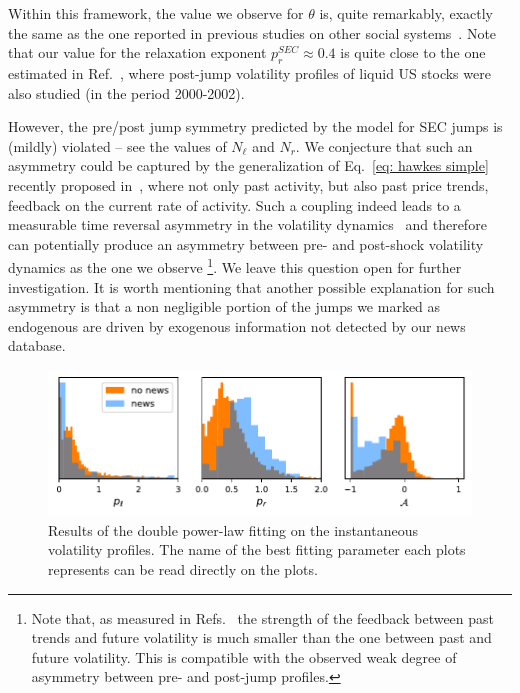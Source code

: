 \documentclass[amsmath,amssymb,aps,pre,floatfix,twocolumn,superscriptaddress]{revtex4}
\begin{document}
Within this framework, the value we observe for $\theta$ is, quite remarkably, exactly the same as the one reported in previous studies on other social systems~\cite{sornette_youtube,sornette_books}. Note that our value for the relaxation exponent $p_r^{SEC} \approx 0.4$ is quite close to the one estimated in Ref.~\cite{zawadowski2006short}, where post-jump volatility profiles of liquid US stocks were also studied (in the period 2000-2002). 

However, the pre/post jump symmetry predicted by the model for SEC jumps is (mildly) violated -- see the values of $N_\ell$ and $N_r$. We conjecture that such an asymmetry could be captured by the generalization of Eq.~\eqref{eq: hawkes simple} recently proposed in~\cite{quadratic_hawkes}, where not only past activity, but also past price trends, feedback on the current rate of activity. Such a coupling indeed leads to a measurable time reversal asymmetry in the volatility dynamics~\cite{quadratic_hawkes} and therefore can potentially produce an asymmetry between pre- and post-shock volatility dynamics as the one we observe \footnote{Note that, as measured in Refs.~\cite{quadratic_hawkes,fosset2020endogenous} the strength of the feedback between past trends and future volatility is much smaller than the one between past and future volatility. This is compatible with the observed weak degree of asymmetry between pre- and post-jump profiles.}. We leave this question open for further investigation. It is worth mentioning that another possible explanation for such asymmetry is that a non negligible portion of the jumps we marked as endogenous are driven by exogenous information not detected by our news database. 

\begin{figure}
  \centering
  \includegraphics[width=0.8\linewidth]{exponets_asymmetry_scipy_fit.pdf}
  \caption{Results of the double power-law fitting on the instantaneous volatility profiles. The name of the best fitting parameter each plots represents can be read directly on the plots.}  
  \label{fig: fit hists}
\end{figure}
\end{document}
